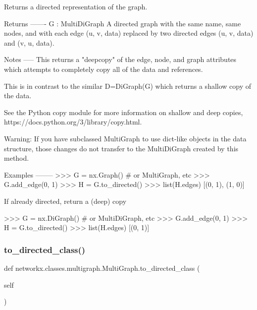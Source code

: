 \begin{DoxyVerb}Returns a directed representation of the graph.

Returns
-------
G : MultiDiGraph
    A directed graph with the same name, same nodes, and with
    each edge (u, v, data) replaced by two directed edges
    (u, v, data) and (v, u, data).

Notes
-----
This returns a "deepcopy" of the edge, node, and
graph attributes which attempts to completely copy
all of the data and references.

This is in contrast to the similar D=DiGraph(G) which returns a
shallow copy of the data.

See the Python copy module for more information on shallow
and deep copies, https://docs.python.org/3/library/copy.html.

Warning: If you have subclassed MultiGraph to use dict-like objects
in the data structure, those changes do not transfer to the
MultiDiGraph created by this method.

Examples
--------
>>> G = nx.Graph()  # or MultiGraph, etc
>>> G.add_edge(0, 1)
>>> H = G.to_directed()
>>> list(H.edges)
[(0, 1), (1, 0)]

If already directed, return a (deep) copy

>>> G = nx.DiGraph()  # or MultiDiGraph, etc
>>> G.add_edge(0, 1)
>>> H = G.to_directed()
>>> list(H.edges)
[(0, 1)]
\end{DoxyVerb}
 \mbox{\label{classnetworkx_1_1classes_1_1multigraph_1_1MultiGraph_ac2fbefff5f966867081af0c054d75b4c}} 
\subsubsection{\texorpdfstring{to\+\_\+directed\+\_\+class()}{to\_directed\_class()}}
{\footnotesize\ttfamily def networkx.\+classes.\+multigraph.\+Multi\+Graph.\+to\+\_\+directed\+\_\+class (\begin{DoxyParamCaption}\item[{}]{self }\end{DoxyParamCaption})}

